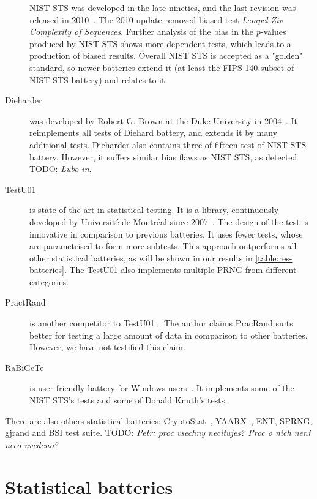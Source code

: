 \documentclass[
  print, %
  Table,   %
  nolof,     %
  nolot,     %
  11pt, %
  oneside  %
]{fithesis3}
\newcommand{\todo}[1]{TODO: \textit{#1}}
\begin{document}
\begin{description}
    NIST STS was developed in the late nineties, and the last revision was released in 2010~\cite{rukhin2001statistical}. The 2010 update removed biased test \textit{Lempel-Ziv Complexity of Sequences}. Further analysis of the bias in the $p$-values produced by NIST STS shows more dependent tests, which leads to a production of biased results. Overall NIST STS is accepted as a "golden" standard, so newer batteries extend it (at least the FIPS 140 subset of NIST STS battery) and relates to it. %
    \item[Dieharder] was developed by Robert G. Brown at the Duke University in 2004~\cite{brown2013dieharder}. It reimplements all tests of Diehard battery, and extends it by many additional tests. Dieharder also contains three of fifteen test of NIST STS battery. However, it suffers similar bias flaws as NIST STS, as detected \todo{Lubo in}. %
    \item[TestU01] is state of the art in statistical testing. It is a library, continuously developed by Université de Montréal since 2007~\cite{l2007testu01}. The design of the test is innovative in comparison to previous batteries. It uses fewer tests, whose are parametrised to form more subtests. This approach outperforms all other statistical batteries, as will be shown in our results in \cref{table:res-batteries}. The TestU01 also implements multiple PRNG from different categories. %
    \item[PractRand] is another competitor to TestU01~\cite{dotypractically}. The author claims PracRand suits better for testing a large amount of data in comparison to other batteries. However, we have not testified this claim.
    \item[RaBiGeTe] is user friendly battery for Windows users~\cite{rabigete}. It implements some of the NIST STS's tests and some of Donald Knuth's tests.
\end{description}

There are also others statistical batteries: CryptoStat~\cite{kaminsky2013cryptostat}, YAARX~\cite{biryukov2014automatic}, ENT, SPRNG, gjrand and BSI test suite. \todo{Petr: proc vsechny necitujes? Proc o nich neni neco uvedeno? }


\section{Statistical batteries}
\label{sec:relatwork-stat}
\end{document}
